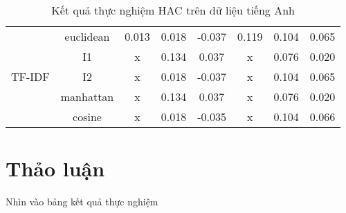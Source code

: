 \begin{table}[ht]
{\begin{tabular}{|c|c|c|c|c|c|c|c|}
\multirow{6}{*}{TF-IDF}                                                   & euclidean   & 0.013    & 0.018    & -0.037    & 0.119    & 0.104    & 0.065 \\ \cline{2-8} 
                                                                          & I1          & x        & 0.134    & 0.037    & x        & 0.076    & 0.020 \\ \cline{2-8} 
                                                                          & I2          & x        & 0.018    & -0.037    & x        & 0.104    & 0.065 \\ \cline{2-8} 
                                                                          & manhattan   & x        & 0.134    & 0.037    & x        & 0.076    & 0.020 \\ \cline{2-8} 
                                                                          & cosine      & x        & 0.018    & -0.035    & x        & 0.104    & 0.066 \\ \cline{2-8} 
                                                                          \hline
\end{tabular}%
}
\caption[Kết quả thực nghiệm HAC trên dữ liệu tiếng Anh]{Kết quả thực nghiệm HAC trên dữ liệu tiếng Anh}
\label{bang_4_8}
\end{table}

\section{Thảo luận}
Nhìn vào bảng kết quả thực nghiệm 


